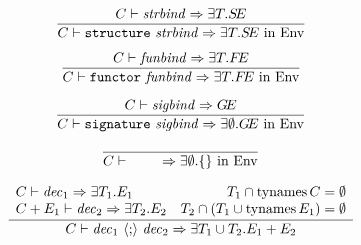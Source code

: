 \begin{equation}	%
\label{structuredec-rule}
\frac{ \C\ts\strbind\ra\EXISTS{\T}{\SE}}
     {\C\ts\structuredec\ra\EXISTS{\T}{\SE\ \In\ \Env}}
\end{equation}

\begin{equation}	%
\label{functordec-rule}
\frac{\C\ts\funbind\ra\EXISTS{\T}{\FE}}
     {\C\ts\functordec\ra\EXISTS{\T}{\FE\ \In\ \Env}}
\end{equation}

\begin{equation}	%
\label{signaturedec-rule}
\frac{\C\ts\sigbind\ra\GE }
     {\C\ts\signaturedec\ra\EXISTS{\emptyset}{\GE\ \In\ \Env}}
\end{equation}

\begin{equation}	%
\frac{}
     {\C\ts\emptydec\ra\EXISTS{\emptyset}{\emptymap\ \In\ \Env}}
\end{equation}

\begin{equation}	%
\frac{\begin{array}{lr}
      \C\ts\dec_1\ra\EXISTS{\T_1}{\E_1} &
      \T_1 \cap \TyNamesFcn \C = \emptyset \\
      \C+\E_1\ts\dec_2\ra\EXISTS{\T_2}{\E_2} &
      \T_2 \cap (\T_1 \cup \TyNamesFcn \E_1) = \emptyset
      \end{array}}
     {\C\ts\seqdec\ra\EXISTS{\T_1\cup\T_2}{\plusmap{E_1}{E_2}}}
\end{equation}



